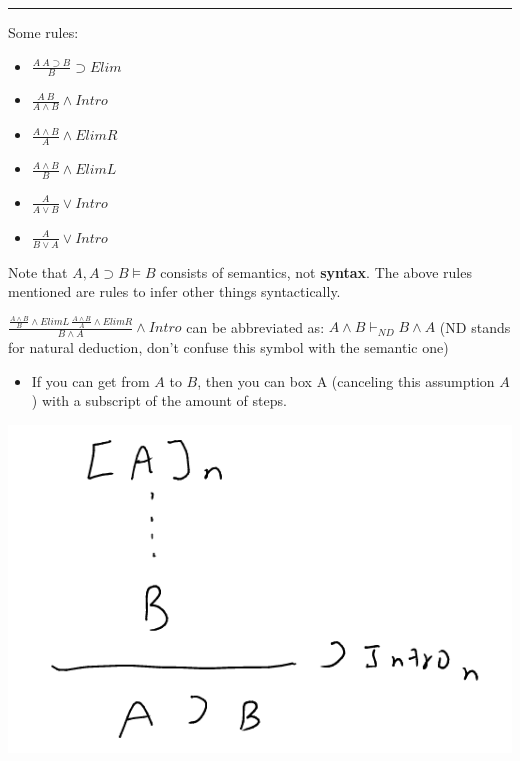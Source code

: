 \documentclass[11pt]{article}
\begin{document}
\noindent\rule{\textwidth}{0.5pt}
Some rules:
\begin{itemize}
\item \(\frac{A \ A\supset B}{B}\supset Elim\)
\item \(\frac{A \ B}{A\wedge B}\wedge Intro\)
\item \(\frac{A \wedge B}{A}\wedge ElimR\)
\item \(\frac{A \wedge B}{B}\wedge ElimL\)
\item \(\frac{A}{A \vee B}\vee Intro\)
\item \(\frac{A}{B \vee A}\vee Intro\)
\end{itemize}
Note that \(A, A \supset B \models B\) consists of semantics, not \textbf{syntax}. The above rules mentioned are rules to infer other things syntactically.

\(\frac{\frac{A \wedge B}{B}\wedge ElimL \ \frac{A \wedge B}{A}\wedge ElimR}{B \wedge A}\wedge Intro\) can be abbreviated as:
\(A \wedge B \vdash_{ND} B \wedge A\) (ND stands for natural deduction, don't confuse this symbol with the semantic one)
\begin{itemize}
\item If you can get from \(A\) to \(B\), then you can box A (canceling this assumption \(A\)) with a subscript of the amount of steps.
\end{itemize}
\begin{center}
\includegraphics[width=.9\linewidth]{./Images/i15.png}
\end{center}
\end{document}
